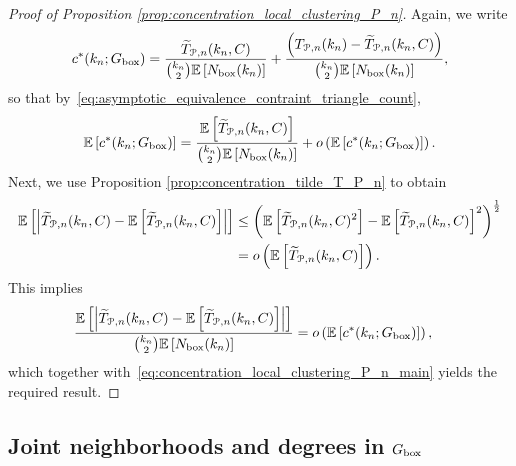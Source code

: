 \begin{proof}[Proof of Proposition \ref{prop:concentration_local_clustering_P_n}]
Again, we write
\begin{align*}
	c^\ast(k_n; G_{\text{box}}) = \frac{\widetilde{T}_{{\mathcal P},n}(k_n,C)}{\binom{k_n}{2}\mathbb{E}\left[N_{\text{box}}(k_n)\right]}
	+ \frac{\left(T_{{\mathcal P},n}(k_n)-\widetilde{T}_{{\mathcal P},n}(k_n,C)\right)}{\binom{k_n}{2}\mathbb{E}\left[N_{\text{box}}(k_n)\right]},
\end{align*}
so that by~\eqref{eq:asymptotic_equivalence_contraint_triangle_count},
\begin{equation}\label{eq:concentration_local_clustering_P_n_main}
	\mathbb{E}\left[c^\ast(k_n; G_{\text{box}})\right] = \frac{\mathbb{E}\left[\widetilde{T}_{{\mathcal P},n}(k_n,C)\right]}{\binom{k_n}{2}\mathbb{E}\left[N_{\text{box}}(k_n)\right]}
	+ o\left(\mathbb{E}\left[c^\ast(k_n; G_{\text{box}})\right]\right).
\end{equation}
Next, we use Proposition \ref{prop:concentration_tilde_T_P_n} to obtain
\begin{align*}
	\mathbb{E}\left[\left|\widetilde{T}_{{\mathcal P},n}(k_n,C) - \mathbb{E}\left[\widetilde{T}_{{\mathcal P},n}(k_n,C)\right]\right|\right]
	&\le \left(\mathbb{E}\left[\widetilde{T}_{{\mathcal P},n}(k_n,C)^2\right] 
		- \mathbb{E}\left[\widetilde{T}_{{\mathcal P},n}(k_n,C)\right]^2\right)^{\frac{1}{2}}\\
	&= o\left(\mathbb{E}\left[\widetilde{T}_{{\mathcal P},n}(k_n,C)\right]\right).
\end{align*}
This implies
\begin{align*}
	\frac{\mathbb{E}\left[\left|\widetilde{T}_{{\mathcal P},n}(k_n,C) - \mathbb{E}\left[\widetilde{T}_{{\mathcal P},n}(k_n,C)\right]\right|\right]}
		{\binom{k_n}{2}\mathbb{E}\left[N_{\text{box}}(k_n)\right]}
	&= o\left(\mathbb{E}\left[c^\ast(k_n; G_{\text{box}})\right]\right),
\end{align*}
which together with~\eqref{eq:concentration_local_clustering_P_n_main} yields the required result.
\end{proof}

\subsection{Joint neighborhoods and degrees in $G_{\text{box}}$}

